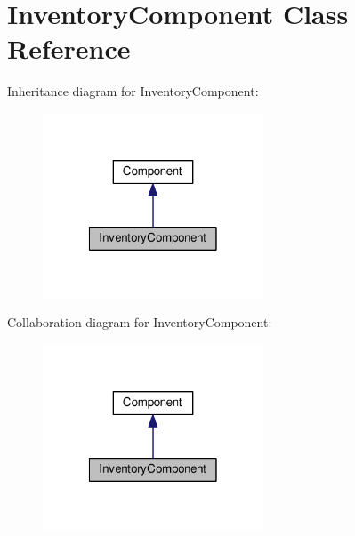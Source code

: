 \hypertarget{classInventoryComponent}{\section{Inventory\-Component Class Reference}
\label{classInventoryComponent}
}


Inheritance diagram for Inventory\-Component\-:
\nopagebreak
\begin{figure}[H]
\begin{center}
\leavevmode
\includegraphics[width=186pt]{classInventoryComponent__inherit__graph}
\end{center}
\end{figure}


Collaboration diagram for Inventory\-Component\-:
\nopagebreak
\begin{figure}[H]
\begin{center}
\leavevmode
\includegraphics[width=186pt]{classInventoryComponent__coll__graph}
\end{center}
\end{figure}
